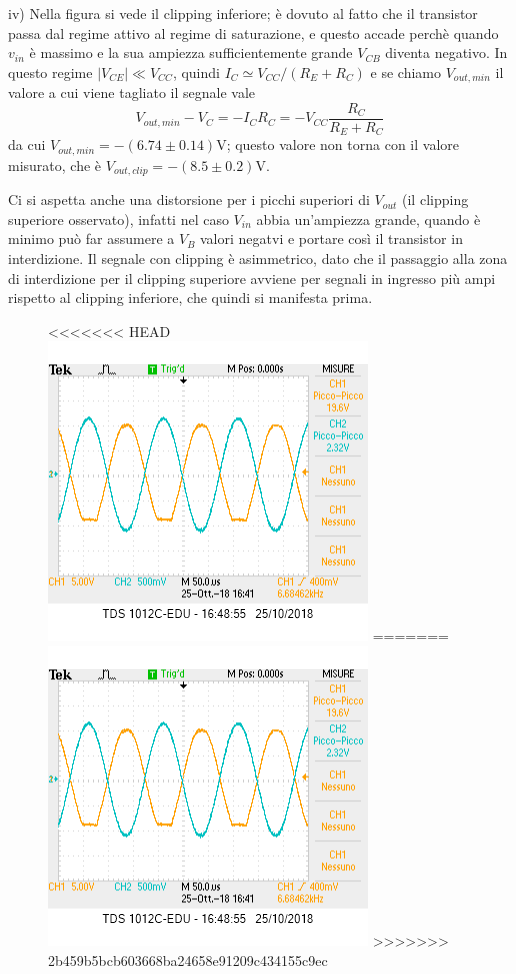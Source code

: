 \documentclass[10pt,a4paper]{article}
\begin{document}
iv) Nella figura si vede il clipping inferiore; è dovuto al fatto che il transistor passa dal regime attivo al regime di saturazione, e questo accade perchè quando $v_{in}$ è massimo e la sua ampiezza sufficientemente grande $ V_{CB}$ diventa negativo.
In questo regime $|V_{CE}|\ll  V_{CC}$, quindi $ I_C \simeq V_{CC}/(R_E+R_C)$ e  se chiamo $V_{out,min}$ il valore a cui viene tagliato il segnale vale \[V_{out,min} -V_C= - I_C R_C = - V_{CC}\frac{R_C}{R_E+R_C}\]
da cui 
$V_{out,min} = -(6.74\pm 0.14) \si{\volt}$; questo valore non torna con il valore misurato, che è $V_{out,clip} = -(8.5\pm 0.2) \si{\volt}$.

Ci si aspetta anche una distorsione per i picchi superiori di $V_{out}$ (il clipping superiore osservato), infatti nel caso   $V_{in}$ abbia un'ampiezza grande, quando è minimo può far assumere a  $V_{B}$ valori negatvi e portare così il transistor in interdizione.
Il segnale con clipping è asimmetrico, dato che il passaggio alla zona di interdizione per il clipping superiore avviene per segnali in ingresso più ampi rispetto al clipping inferiore, che quindi si manifesta prima.

\begin{figure}[h]
	\centering
<<<<<<< HEAD
	\includegraphics[scale=0.5]{clipping.png}
	\label{Clipping osservato (inferiore e superiore)}
=======
	\includegraphics[scale=0.7]{clipping.png}
>>>>>>> 2b459b5bcb603668ba24658e91209c434155c9ec
\end{figure}
\end{document}
